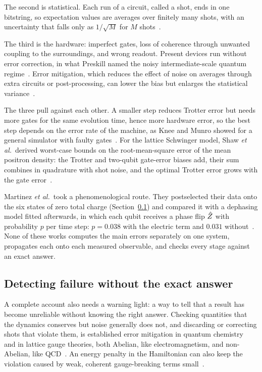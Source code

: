 The second is statistical. Each run of a circuit, called a shot, ends in one
bitstring, so expectation values are averages over finitely many shots, with an
uncertainty that falls only as $1/\sqrt{M}$ for $M$ shots~\cite{taylor1997}.

The third is the hardware: imperfect gates, loss of coherence through unwanted
coupling to the surroundings, and wrong readout. Present devices run without
error correction, in what Preskill named the noisy intermediate-scale quantum
regime~\cite{preskill2018}. Error mitigation, which reduces the effect of noise
on averages through extra circuits or post-processing, can lower the bias but
enlarges the statistical variance~\cite{cai2023}.

The three pull against each other. A smaller step reduces Trotter error but
needs more gates for the same evolution time, hence more hardware error, so the
best step depends on the error rate of the machine, as Knee and Munro showed for
a general simulator with faulty gates~\cite{knee2015}. For the lattice Schwinger
model, Shaw \emph{et al.}\ derived worst-case bounds on the root-mean-square
error of the mean positron density: the Trotter and two-qubit gate-error biases
add, their sum combines in quadrature with shot noise, and the optimal Trotter
error grows with the gate error~\cite{shaw2020}.

Martinez \emph{et al.}\ took a phenomenological route. They postselected their
data onto the six states of zero total charge (Section~\ref{sec:intro-diagnostic})
and compared it with a dephasing model fitted afterwards, in which each qubit receives a phase flip
$\hat{Z}_{}$ with probability $p$ per time step: $p = 0.038$ with the electric term
and $0.031$ without~\cite{martinez2016}. None of these works computes the main
errors separately on one system, propagates each onto each measured observable,
and checks every stage against an exact answer.

\subsection{Detecting failure without the exact answer}
\label{sec:intro-diagnostic}

A complete account also needs a warning light: a way to tell that a result has
become unreliable without knowing the right answer. Checking quantities that the
dynamics conserves but noise generally does not, and discarding or correcting
shots that violate them, is established error mitigation in quantum
chemistry~\cite{bonetmonroig2018,mcardle2019} and in lattice gauge theories,
both Abelian, like electromagnetism, and non-Abelian, like
QCD~\cite{stryker2019,ballini2025}. An energy penalty in the Hamiltonian can
also keep the violation caused by weak, coherent gauge-breaking terms
small~\cite{halimeh2020}.

